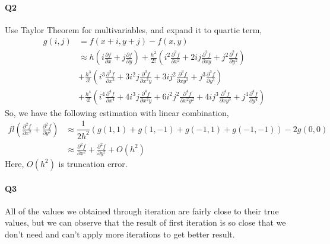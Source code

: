 \documentclass[11pt]{article}
\begin{document}
\paragraph{Q2}
Use Taylor Theorem for multivariables, and expand it to quartic term,
\begin{align}
	g(i,j)&=f(x+i,y+j)-f(x,y)\\
	&\approx h(i\frac{\partial f}{\partial x}+j\frac{\partial f}{\partial y})+\frac{h^2}{2!}(i^2\frac{\partial^2f}{\partial x^2}+2ij\frac{\partial^2f}{\partial xy}+j^2\frac{\partial^2f}{\partial y^2})\\
	&+\frac{h^3}{3!}(i^3\frac{\partial^3f}{\partial x^3}+3i^2j\frac{\partial^3f}{\partial x^2y}+3ij^2\frac{\partial^3f}{\partial xy^2}+j^3\frac{\partial^3f}{\partial y^3})\\
	&+\frac{h^4}{4!}(i^4\frac{\partial^4f}{\partial x^4}+4i^3j\frac{\partial^4f}{\partial x^3y}+6i^2j^2\frac{\partial^4f}{\partial x^2y^2}+4ij^3\frac{\partial^4f}{\partial xy^3}+j^4\frac{\partial^4f}{\partial y^4})
\end{align}
So, we have the following estimation with linear combination,
\begin{align}
fl(\frac{\partial^2f}{\partial x^2}+\frac{\partial^2f}{\partial y^2})&\approx \dfrac{1}{2h^2}(g(1,1)+g(1,-1)+g(-1,1)+g(-1,-1))-2g(0,0)\\
&\approx\frac{\partial^2f}{\partial x^2}+\frac{\partial^2f}{\partial y^2}+O(h^2)
\end{align}
Here, $O(h^2)$ is truncation error.
\paragraph{Q3}
All of the values we obtained through iteration are fairly close to their true values, but we can observe that the result of first iteration is so close that we don't need and can't apply more iterations to get better result. 
\begin{figure}[H]
	\centering
\end{figure}
\end{document}
